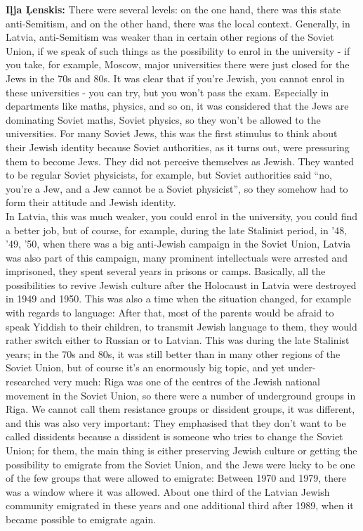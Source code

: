 \textbf{Iļja Ļenskis:} There were several levels: on the one hand, there was this state anti-Semitism, and on the other hand, there was the local context. Generally, in Latvia, anti-Semitism was weaker than in certain other regions of the Soviet Union, if we speak of such things as the possibility to enrol in the university - if you take, for example, Moscow, major universities there were just closed for the Jews in the 70s and 80s. It was clear that if you’re Jewish, you cannot enrol in these universities - you can try, but you won’t pass the exam. Especially in departments like maths, physics, and so on, it was considered that the Jews are dominating Soviet maths, Soviet physics, so they won't be allowed to the universities. For many Soviet Jews, this was the first stimulus to think about their Jewish identity because Soviet authorities, as it turns out, were pressuring them to become Jews. They did not perceive themselves as Jewish. They wanted to be regular Soviet physicists, for example, but Soviet authorities said ``no, you’re a Jew, and a Jew cannot be a Soviet physicist'', so they somehow had to form their attitude and Jewish identity.\\ 
In Latvia, this was much weaker, you could enrol in the university, you could find a better job, but of course, for example, during the late Stalinist period, in '48, '49, '50, when there was a big anti-Jewish campaign in the Soviet Union, Latvia was also part of this campaign, many prominent intellectuals were arrested and imprisoned, they spent several years in prisons or camps. Basically, all the possibilities to revive  Jewish culture after the Holocaust in Latvia were destroyed in 1949 and 1950. This was also a time when the situation changed, for example with regards to language: After that, most of the parents would be afraid to speak Yiddish to their children, to transmit Jewish language to them, they would rather switch either to Russian or to Latvian. This was during the late Stalinist years; in the 70s and 80s, it was still better than in many other regions of the Soviet Union, but of course it’s an enormously big topic, and yet under-researched very much: Riga was one of the centres of the Jewish national movement in the Soviet Union, so there were a number of underground groups in Riga. We cannot call them resistance groups or dissident groups, it was different, and this was also very important: They emphasised that they don’t want to be called dissidents because a dissident is someone who tries to change the Soviet Union; for them, the main thing is either preserving Jewish culture or getting the possibility to emigrate from the Soviet Union, and the Jews were lucky to be one of the few groups that were allowed to emigrate: Between 1970 and 1979, there was a window where it was allowed. About one third of the Latvian Jewish community emigrated in these years and one additional third after 1989, when it became possible to emigrate again. 

